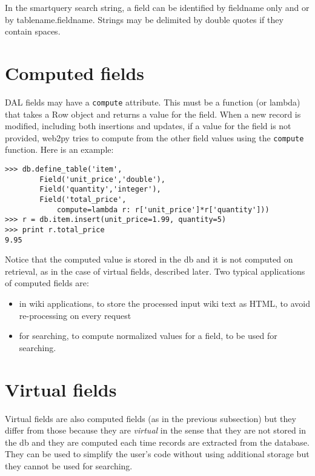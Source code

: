 \documentclass[justified,sixbynine,notoc]{tufte-book}
\def\ft{\small\tt}
\def\inxx#1{\index{#1}}
\begin{document}
\begin{fullwidth}
In the smartquery search string, a field can be identified by fieldname only and or by tablename.fieldname. Strings may be delimited by double quotes if they contain spaces.

\goodbreak\section{Computed fields}

\inxx{compute}

DAL fields may have a {\ft compute} attribute. This must be a function (or lambda) that takes a Row object and returns a value for the field. When a new record is modified, including both insertions and updates, if a value for the field is not provided, web2py tries to compute from the other field values using the {\ft compute} function. Here is an example:
\begin{lstlisting}
>>> db.define_table('item',
        Field('unit_price','double'),
        Field('quantity','integer'),
        Field('total_price',
            compute=lambda r: r['unit_price']*r['quantity']))
>>> r = db.item.insert(unit_price=1.99, quantity=5)
>>> print r.total_price
9.95
\end{lstlisting}

Notice that the computed value is stored in the db and it is not computed on retrieval, as in the case of virtual fields, described later. Two typical applications of computed fields are:
\begin{itemize}
\item in wiki applications, to store the processed input wiki text as HTML, to avoid re-processing on every request

\item for searching, to compute normalized values for a field, to be used for searching.
\end{itemize}

\goodbreak\section{Virtual fields}

\inxx{virtual fields}

Virtual fields are also computed fields (as in the previous subsection) but they differ from those because they are {\it virtual} in the sense that they are not stored in the db and they are computed each time records are extracted from the database. They can be used to simplify the user's code without using additional storage but they cannot be used for searching.


\end{fullwidth}
\end{document}

